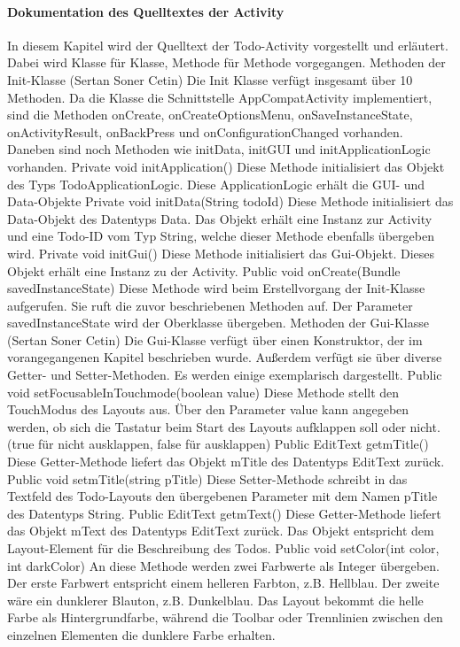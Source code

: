 \paragraph{Dokumentation des Quelltextes der Activity}
In diesem Kapitel wird der Quelltext der Todo-Activity vorgestellt und erläutert. Dabei wird Klasse für Klasse, Methode für Methode vorgegangen. 
Methoden der Init-Klasse (Sertan Soner Cetin)
Die Init Klasse verfügt insgesamt über 10 Methoden. Da die Klasse die Schnittstelle AppCompatActivity implementiert, sind die Methoden onCreate, onCreateOptionsMenu, onSaveInstanceState, onActivityResult, onBackPress und onConfigurationChanged vorhanden. Daneben sind noch Methoden wie initData, initGUI und initApplicationLogic vorhanden.
Private void initApplication() 
Diese Methode initialisiert das Objekt des Typs TodoApplicationLogic. Diese ApplicationLogic erhält die GUI- und Data-Objekte
Private void initData(String todoId)
Diese Methode initialisiert das Data-Objekt des Datentyps Data. Das Objekt erhält eine Instanz zur Activity und eine Todo-ID vom Typ String, welche dieser Methode ebenfalls übergeben wird.
Private void initGui()
Diese Methode initialisiert das Gui-Objekt. Dieses Objekt erhält eine Instanz zu der Activity.
Public void onCreate(Bundle savedInstanceState)
Diese Methode wird beim Erstellvorgang der Init-Klasse aufgerufen. Sie ruft die zuvor beschriebenen Methoden auf. Der Parameter savedInstanceState wird der Oberklasse übergeben.
Methoden der Gui-Klasse (Sertan Soner Cetin)
Die Gui-Klasse verfügt über einen Konstruktor, der im vorangegangenen Kapitel beschrieben wurde. Außerdem verfügt sie über diverse Getter- und Setter-Methoden. Es werden einige exemplarisch dargestellt.
Public void setFocusableInTouchmode(boolean value)
Diese Methode stellt den TouchModus des Layouts aus. Über den Parameter value kann angegeben werden, ob sich die Tastatur beim Start des Layouts aufklappen soll oder nicht. (true für nicht ausklappen, false für ausklappen)
Public EditText getmTitle()
	Diese Getter-Methode liefert das Objekt mTitle des Datentyps EditText zurück.
Public void setmTitle(string pTitle)
Diese Setter-Methode schreibt in das Textfeld des Todo-Layouts den übergebenen Parameter mit dem Namen pTitle des Datentyps String.
Public EditText getmText()
Diese Getter-Methode liefert das Objekt mText des Datentyps EditText zurück. Das Objekt entspricht dem Layout-Element für die Beschreibung des Todos.
Public void setColor(int color, int darkColor)
An diese Methode werden zwei Farbwerte als Integer übergeben. Der erste Farbwert entspricht einem helleren Farbton, z.B. Hellblau. Der zweite wäre ein dunklerer Blauton, z.B. Dunkelblau. Das Layout bekommt die helle Farbe als Hintergrundfarbe, während die Toolbar oder Trennlinien zwischen den einzelnen Elementen die dunklere Farbe erhalten.
